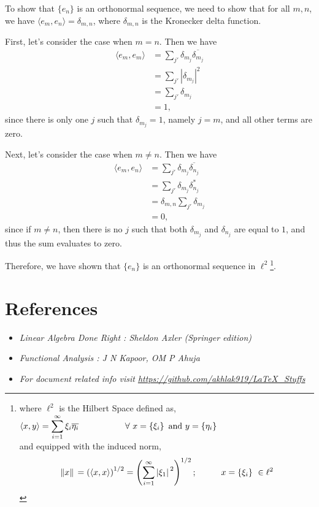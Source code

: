 \documentclass[12pt, a4paper]{article} %
\begin{document}
        To show that $\{e_n\}$ is an orthonormal sequence, we need to show that for all $m,n$, we have $\langle e_m, e_n\rangle = \delta_{m,n}$, where $\delta_{m,n}$ is the Kronecker delta function.
        
        First, let's consider the case when $m=n$. Then we have
        \begin{align*}
        \langle e_m, e_m\rangle &= \sum_{j'} \delta_{m_j} \overline{\delta_{m_j}} \\
        &= \sum_{j'} |\delta_{m_j}|^2 \\
        &= \sum_{j'} \delta_{m_j} \\
        &= 1,
        \end{align*}
        since there is only one $j$ such that $\delta_{m_j} = 1$, namely $j=m$, and all other terms are zero.
        
        Next, let's consider the case when $m\neq n$. Then we have
        \begin{align*}
        \langle e_m, e_n\rangle &= \sum_{j'} \delta_{m_j} \overline{\delta_{n_j}} \\
        &= \sum_{j'} \delta_{m_j} \delta_{n_j}^* \\
        &= \delta_{m,n} \sum_{j'} \delta_{m_j} \\
        &= 0,
        \end{align*}
        since if $m\neq n$, then there is no $j$ such that both $\delta_{m_j}$ and $\delta_{n_j}$ are equal to $1$, and thus the sum evaluates to zero.
        
        Therefore, we have shown that $\{e_n\}$ is an orthonormal sequence in $\ell^2$\footnote{where $\ell^2$ is the Hilbert Space defined as, $\displaystyle{\langle x, y \rangle = \sum_{i=1}^{\infty}\xi_i \overline{\eta_{i}}} \hspace*{1.9cm} \forall\  x = \left\{\xi_i \right\}\ \mbox{and}\  y = \left\{\eta_i \right\}$\\ and equipped with the induced norm, \[\norm*{x} = \left(\langle x, x \rangle\right)^{1/2} = \left(\sum_{i=1}^{\infty} \abs*{\xi_1}^2\right)^{1/2}; \hspace*{1cm} x = \left\{\xi_i\right\}\ \in \ell^2\]}.

\section{References}

\begin{itemize}
    \item \slshape Linear Algebra Done Right : Sheldon Axler (Springer edition)
    \item \slshape Functional Analysis : J N Kapoor, OM P Ahuja
    \item \slshape For document related info visit \url{https://github.com/akhlak919/LaTeX_Stuffs}
\end{itemize}
\end{document}

